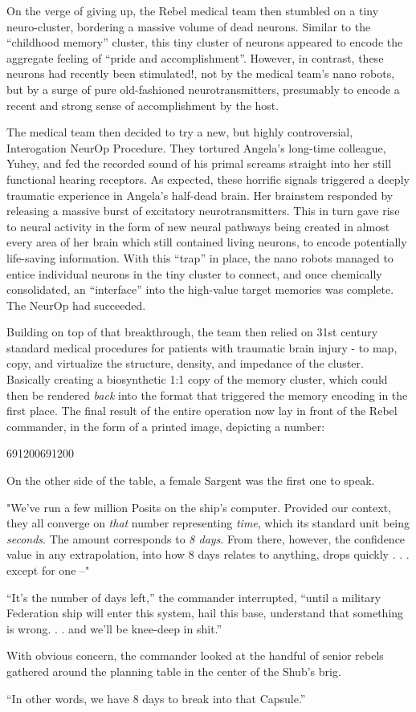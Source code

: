 \documentclass[smalldemyvopaper,11pt,twoside,onecolumn,openright,extrafontsizes]{memoir}
\newlength\drop
\begin{document}
 
  On the verge of giving up, the Rebel medical team then stumbled on a tiny neuro-cluster, bordering a massive volume of dead neurons. Similar to the “childhood memory” cluster, this tiny cluster of neurons appeared to encode the aggregate feeling of “pride and accomplishment”. However, in contrast, these neurons had recently been stimulated!, not by the medical team’s nano robots, but by a surge of pure old-fashioned neurotransmitters, presumably to encode a recent and strong sense of accomplishment by the host.

 
  The medical team then decided to try a new, but highly controversial, Interogation NeurOp Procedure. They tortured Angela’s long-time colleague, Yuhey, and fed the recorded sound of his primal screams straight into her still functional hearing receptors. As expected, these horrific signals triggered a deeply traumatic experience in Angela’s half-dead brain. Her brainstem responded by releasing a massive burst of excitatory neurotransmitters. This in turn gave rise to neural activity in the form of new neural pathways being created in almost every area of her brain which still contained living neurons, to encode potentially life-saving information. With this “trap” in place, the nano robots managed to entice individual neurons in the tiny cluster to connect, and once chemically consolidated, an “interface” into the high-value target memories was complete. The NeurOp had succeeded.

 
  Building on top of that breakthrough, the team then relied on 31st century standard medical procedures for patients with traumatic brain injury - to map, copy, and virtualize the structure, density, and impedance of the cluster. Basically creating a biosynthetic 1:1 copy of the memory cluster, which could then be rendered \textit{back} into the format that triggered the memory encoding in the first place. The final result of the entire operation now lay in front of the Rebel commander, in the form of a printed image, depicting a number:

 691200691200

On the other side of the table, a female Sargent was the first one to speak.

 
"We’ve run a few million Posits on the ship’s computer. Provided our context, they all converge on \textit{that} number representing \textit{time}, which its standard unit being \textit{seconds}. The amount corresponds to \textit{8 days}. From there, however, the confidence value in any extrapolation, into how 8 days relates to anything, drops quickly . . . except for one –"

 
 “It’s the number of days left,” the commander interrupted, “until a military Federation ship will enter this system, hail this base, understand that something is wrong. . . and we’ll be knee-deep in shit.”

 
  With obvious concern, the commander looked at the handful of senior rebels gathered around the planning table in the center of the Shub’s brig.

 
  “In other words, we have 8 days to break into that Capsule.”


\end{document}
